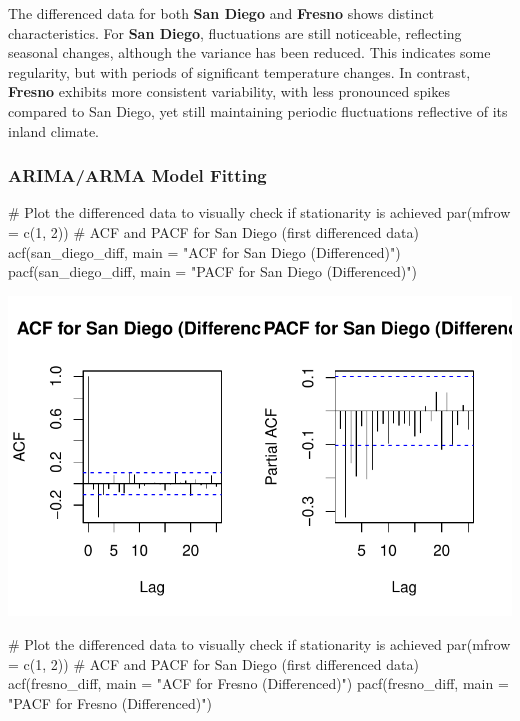 \documentclass[
  11pt,
]{article}
\newenvironment{Shaded}{\begin{snugshade}}{\end{snugshade}}
\newcommand{\AttributeTok}[1]{\textcolor[rgb]{0.40,0.45,0.13}{#1}}
\newcommand{\CommentTok}[1]{\textcolor[rgb]{0.37,0.37,0.37}{#1}}
\newcommand{\DecValTok}[1]{\textcolor[rgb]{0.68,0.00,0.00}{#1}}
\newcommand{\FunctionTok}[1]{\textcolor[rgb]{0.28,0.35,0.67}{#1}}
\newcommand{\NormalTok}[1]{\textcolor[rgb]{0.00,0.23,0.31}{#1}}
\newcommand{\StringTok}[1]{\textcolor[rgb]{0.13,0.47,0.30}{#1}}
\begin{document}
The differenced data for both \textbf{San Diego} and \textbf{Fresno}
shows distinct characteristics. For \textbf{San Diego}, fluctuations are
still noticeable, reflecting seasonal changes, although the variance has
been reduced. This indicates some regularity, but with periods of
significant temperature changes. In contrast, \textbf{Fresno} exhibits
more consistent variability, with less pronounced spikes compared to San
Diego, yet still maintaining periodic fluctuations reflective of its
inland climate.

\subsubsection{ARIMA/ARMA Model Fitting}\label{arimaarma-model-fitting}

\begin{Shaded}
\begin{Highlighting}[]
\CommentTok{\# Plot the differenced data to visually check if stationarity is achieved}
\FunctionTok{par}\NormalTok{(}\AttributeTok{mfrow =} \FunctionTok{c}\NormalTok{(}\DecValTok{1}\NormalTok{, }\DecValTok{2}\NormalTok{)) }
\CommentTok{\# ACF and PACF for San Diego (first differenced data)}
\FunctionTok{acf}\NormalTok{(san\_diego\_diff, }\AttributeTok{main =} \StringTok{"ACF for San Diego (Differenced)"}\NormalTok{)}
\FunctionTok{pacf}\NormalTok{(san\_diego\_diff, }\AttributeTok{main =} \StringTok{"PACF for San Diego (Differenced)"}\NormalTok{)}
\end{Highlighting}
\end{Shaded}

\includegraphics{project_files/figure-pdf/unnamed-chunk-86-1.pdf}

\begin{Shaded}
\begin{Highlighting}[]
\CommentTok{\# Plot the differenced data to visually check if stationarity is achieved}
\FunctionTok{par}\NormalTok{(}\AttributeTok{mfrow =} \FunctionTok{c}\NormalTok{(}\DecValTok{1}\NormalTok{, }\DecValTok{2}\NormalTok{)) }
\CommentTok{\# ACF and PACF for San Diego (first differenced data)}
\FunctionTok{acf}\NormalTok{(fresno\_diff, }\AttributeTok{main =} \StringTok{"ACF for Fresno (Differenced)"}\NormalTok{)}
\FunctionTok{pacf}\NormalTok{(fresno\_diff, }\AttributeTok{main =} \StringTok{"PACF for Fresno (Differenced)"}\NormalTok{)}
\end{Highlighting}
\end{Shaded}
\end{document}
